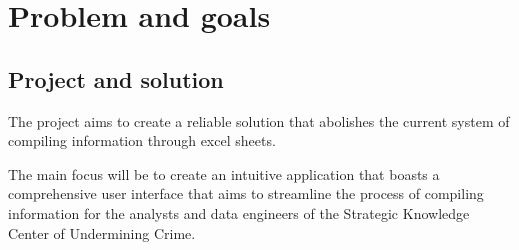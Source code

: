 \section{Problem and goals}
\label{sec:Problem-and-goals}

\subsection{Project and solution}
\label{subsec:Project-or-Solution}

The project aims to create a reliable solution that abolishes the current system of compiling information through excel sheets. 

The main focus will be to create an intuitive application that boasts a comprehensive user interface that aims to streamline the process of compiling information for the analysts and data engineers of the Strategic Knowledge Center of Undermining Crime.